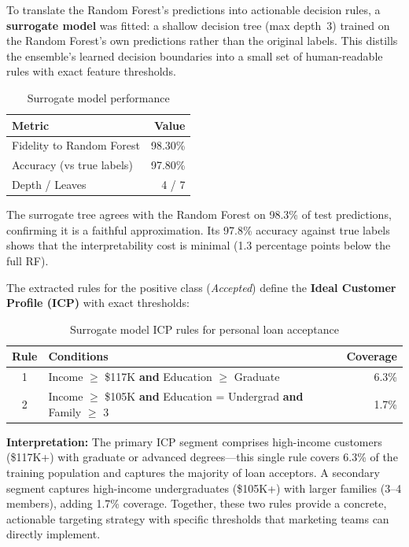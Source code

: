 \documentclass[11pt, a4paper]{article}
\begin{document}
To translate the Random Forest's predictions into actionable decision rules, a
\textbf{surrogate model} was fitted: a shallow decision tree (max depth~3)
trained on the Random Forest's own predictions rather than the original labels.
This distills the ensemble's learned decision boundaries into a small set of
human-readable rules with exact feature thresholds.

\begin{table}[H]
\centering
\caption{Surrogate model performance}
\label{tab:surrogate}
\begin{tabular}{@{} l r @{}}
\toprule
\textbf{Metric} & \textbf{Value} \\
\midrule
Fidelity to Random Forest & 98.30\% \\
Accuracy (vs true labels) & 97.80\% \\
Depth / Leaves            & 4 / 7 \\
\bottomrule
\end{tabular}
\end{table}

The surrogate tree agrees with the Random Forest on 98.3\% of test predictions,
confirming it is a faithful approximation. Its 97.8\% accuracy against true
labels shows that the interpretability cost is minimal (1.3 percentage points
below the full RF).

The extracted rules for the positive class (\textit{Accepted}) define the
\textbf{Ideal Customer Profile (ICP)} with exact thresholds:

\begin{table}[H]
\centering
\caption{Surrogate model ICP rules for personal loan acceptance}
\label{tab:icp_rules}
\begin{tabular}{@{} c p{8.5cm} r @{}}
\toprule
\textbf{Rule} & \textbf{Conditions} & \textbf{Coverage} \\
\midrule
1 & Income $\geq$ \$117K \textbf{and} Education $\geq$ Graduate & 6.3\% \\
2 & Income $\geq$ \$105K \textbf{and} Education = Undergrad \textbf{and} Family $\geq$ 3 & 1.7\% \\
\bottomrule
\end{tabular}
\end{table}

\textbf{Interpretation:} The primary ICP segment comprises high-income customers
(\$117K+) with graduate or advanced degrees---this single rule covers 6.3\% of
the training population and captures the majority of loan acceptors. A secondary
segment captures high-income undergraduates (\$105K+) with larger families
(3--4 members), adding 1.7\% coverage. Together, these two rules provide a
concrete, actionable targeting strategy with specific thresholds that marketing
teams can directly implement.
\end{document}
